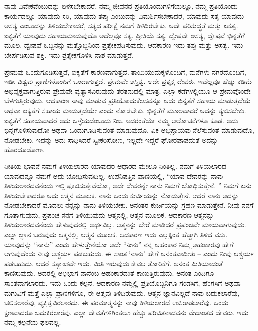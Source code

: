 ನಾವು ವಿವೇಕವೆಂಬುದನ್ನು ಬಳಸಬೇಕಾದರೆ, ನಮ್ಮ ಜೀವನದ ಪ್ರತಿಯೊಂದುಗಳಿಗೆ\break ಯಲ್ಲೂ, ನಮ್ಮ ಪ್ರತಿಯೊಂದು ಕಾರ್ಯದಲ್ಲೂ ಯಾವುದು ಸರಿ, ಯಾವುದು ತಪ್ಪು ಎಂಬುದನ್ನು ವಿಮರ್ಶಿಸಬೇಕಾದರೆ, ಯಾವುದು ಸತ್ಯ ಯಾವುದು ಅಸತ್ಯ ಎಂಬುದನ್ನು ತಿಳಿಯಬೇಕಾದರೆ, ಸತ್ಯದ ಪರೀಕ್ಷೆ ನಮಗೆ ತಿಳಿದಿರಬೇಕು. ಅದೇ ಪರಿಶುದ್ಧತೆ ಮತ್ತು ಏಕತ್ವ. ಐಕ್ಯತೆಗೆ ಯಾವುದು ಸಹಾಯಮಾಡುವುದೊ ಅದೆಲ್ಲವೂ ಸತ್ಯ. ಪ್ರೀತಿಯೆ ಸತ್ಯ. ದ್ವೇಷವೇ ಅಸತ್ಯ, ದ್ವೇಷವೆ ಭಿನ್ನತೆಗೆ ಮೂಲ. ದ್ವೇಷವೆ ಒಬ್ಬನನ್ನು ಮತ್ತೊಬ್ಬನಿಂದ ಪ್ರತ್ಯೇಕಪಡಿಸುವುದು. ಆದಕಾರಣ ಇದು ತಪ್ಪು ಮತ್ತು ಅಸತ್ಯ. ಇದು ಬೇರ್ಪಡಿಸುವ ಶಕ್ತಿ. ಇದು ಪ್ರತ್ಯೇಕಗೊಳಿಸಿ ನಾಶ ಮಾಡುತ್ತದೆ. 

ಪ್ರೇಮವು ಒಂದುಗೂಡಿಸುತ್ತದೆ, ಐಕ್ಯತೆಗೆ ಕಾರಣವಾಗುತ್ತದೆ. ತಾಯಿಯು\break ಮಕ್ಕಳೊಂದಿಗೆ, ಮನೆಗಳು ನಗರದೊಂದಿಗೆ, ಇಡೀ ವಿಶ್ವವು ಪ್ರಾಣಿಗಳೊಂದಿಗೆ ಒಂದಾಗುತ್ತದೆ. ಪ್ರೇಮವೇ ಅಸ್ತಿತ್ವ. ಅದೇ ಪ್ರತ್ಯಕ್ಷ ದೇವರು. ಇವೆಲ್ಲವೂ ಹೆಚ್ಚು ಕಡಿಮೆ ಅಭಿವ್ಯಕ್ತವಾಗುತ್ತಿರುವ ಪ್ರೇಮವೇ ವ್ಯತ್ಯಾಸವಿರುವುದು ತರತಮದಲ್ಲಿ ಮಾತ್ರ. ಎಲ್ಲಾ ಕಡೆಗಳಲ್ಲಿಯೂ ಆ ಪ್ರೇಮವೊಂದೇ ಬೆಳಗುತ್ತಿರುವುದು. ಆದಕಾರಣ ನಾವು ಮಾಡುವ ಪ್ರತಿಯೊಂದು\break ಕೆಲಸವನ್ನೂ ಅದು ಭಿನ್ನತೆಗೆ ಸಹಾಯ ಮಾಡುತ್ತದೆಯೆ ಅಥವಾ ಐಕ್ಯತೆಗೆ ಸಹಾಯ ಮಾಡುತ್ತದೆಯೇ ಎಂದು ನೋಡಬೇಕು. ಭಿನ್ನತೆಗೆ ಮೂಲವಾದರೆ ಅದನ್ನು ತ್ಯಜಿಸಬೇಕು. ಐಕ್ಯತೆಗೆ ಸಹಾಯವಾದರೆ ಅದು ಒಳ್ಳೆಯದೆಂಬುದು ನಿಜ. ಅದರಂತೆಯೇ ನಮ್ಮ ಆಲೋಚನೆಗಳೂ ಕೂಡ. ಅದು ಭಿನ್ನಗೊಳಿಸುವುದೋ ಅಥವಾ ಒಂದುಗೂಡಿಸುವಂತೆ ಮಾಡುವುದೊ, ಏಕ ಅಭಿಪ್ರಾಯವು ನೆಲೆಸುವಂತೆ ಮಾಡುವುದೊ, ನೋಡಬೇಕು. ಇದನ್ನು ಅದು ಸಾಧಿಸಿದರೆ ಸ್ವೀಕರಿಸೋಣ, ಇಲ್ಲದೇ ಇದ್ದರೆ ಘೋರಪಾಪದಂತೆ ಅದನ್ನು ಹೊರದೂಡೋಣ. 

ನೀತಿಯ ಭಾವನೆ ನಮಗೆ ತಿಳಿಯಲಾರದ ಯಾವುದರ ಆಧಾರದ ಮೇಲೂ ನಿಂತಿಲ್ಲ. ನಮಗೆ ತಿಳಿಯಲಾರದ ಯಾವುದನ್ನೂ ನಮಗೆ ಅದು ಬೋಧಿಸುವುದಿಲ್ಲ. ಉಪನಿಷತ್ತಿನ ವಾಣಿಯಲ್ಲಿ, “ಯಾವ ದೇವರನ್ನು ನಾವು ತಿಳಿಯಲಾರದವನೆಂದು ಇಲ್ಲಿ ಪೂಜಿಸುತ್ತೇ\break ವೆಯೋ, ಅದೇ ದೇವರನ್ನೇ ನಾನು ನಿಮಗೆ ಬೋಧಿಸುತ್ತೇನೆ. ” ನಿಮಗೆ ಏನು ತಿಳಿಯಬೇಕಾದರೂ ಅದು ಆತ್ಮನ ಮೂಲಕ. ನಾನು ಒಂದು ಕುರ್ಚಿಯನ್ನು ನೋಡುತ್ತೇನೆ. ಆದರೆ ನಾನು ಅದನ್ನು ನೋಡಬೇಕಾದರೆ ಮೊದಲು ನನ್ನನ್ನು ನಾನು ತಿಳಿಯಬೇಕು. ಅನಂತರ ಕುರ್ಚಿಯನ್ನು ಗ್ರಹಣ ಮಾಡುತ್ತೇನೆ. ನೀವು ನನಗೆ ಗೊತ್ತಾಗುವುದು, ಪ್ರಪಂಚ ನನಗೆ ತಿಳಿಯುವುದು ಆತ್ಮನಲ್ಲಿ, ಆತ್ಮನ ಮೂಲಕ. ಆದಕಾರಣ ಆತ್ಮನನ್ನು ತಿಳಿಯಲಾರದವನೆಂದು ಹೇಳುವುದರಲ್ಲಿ ಅರ್ಥವಿಲ್ಲ. ಆತ್ಮನನ್ನು ಬೇರೆ ಮಾಡಿದರೆ ಪ್ರಪಂಚವೇ ಮಾಯವಾಗುವುದು. ಎಲ್ಲಾ ಜ್ಞಾನ ಬರುವುದು ಆತ್ಮನಲ್ಲಿ, ಆತ್ಮನ ಮೂಲಕ. ಆದಕಾರಣ ಇದು ಎಲ್ಲಕ್ಕಿಂತ ಹೆಚ್ಚಾಗಿ ತಿಳಿದ ವಸ್ತು. ಯಾವುದನ್ನು “ನಾನು” ಎಂದು ಹೇಳುತ್ತೇನೆಯೋ ಅದೇ “ನೀನು” ನನ್ನ ಅಹಂಕಾರ ನಿಮ್ಮ ಅಹಂಕಾರವು ಹೇಗೆ ಆಗುವುದೆಂದು ನೀವು ಆಶ್ಚರ್ಯ ಪಡಬಹುದು. ಈ ಸಾಂತ ‘ನಾನು’ ಹೇಗೆ ಅನಂತವಾದೀತು – ಎಂದು ನೀವು ಆಶ್ಚರ್ಯ ಪಡಬಹುದು. ಆದರೆ ಸತ್ಯಾಂಶವೇ ಇದು. ಮಿತಿ ಇರುವುದು ಕೇವಲ ತೋರಿಕೆಗೆ. ಅನಂತ ಮಿತಿಯಾದಂತೆ ಕಾಣಿಸುವುದು. ಅದರಲ್ಲಿ ಅಲ್ಪಭಾಗ ನಾನೆಂಬ ಅಹಂಕಾರದಂತೆ ಕಾಣುತ್ತಿರುವುದು. ಅನಂತ ಎಂದಿಗೂ ಸಾಂತವಾಗಲಾರದು. ಇದು ಒಂದು ಕಲ್ಪನೆ. ಆದಕಾರಣ ನಮ್ಮಲ್ಲಿ ಪ್ರತಿಯೊಬ್ಬನಿಗೂ ಗಂಡಸಿಗೆ, ಹೆಂಗಸಿಗೆ ಅಥವಾ ಮಗುವಿಗೆ ಮತ್ತೆ ಎಲ್ಲಾ ಪ್ರಾಣಿಗಳಿಗೂ, ಈ ಆತ್ಮವು ತಿಳಿದಿರುವುದು. ಆತ್ಮನ ಜ್ಞಾನವಿಲ್ಲದೆ ನಾವು ಬದುಕಲಾರೆವು, ಚಲಿಸಲಾರೆವು, ವ್ಯಕ್ತಿತ್ವವಿರಲಾರದು. ಈ ಪರಮಾತ್ಮನನ್ನು ನಾವು ತಿಳಿಯಲಾರದೆ ಉಸಿರಾಡಲಾರೆವು. ಒಂದು ಕ್ಷಣವಾದರೂ ಬದುಕಿರಲಾರೆವು. ಎಲ್ಲಾ ದೇವತೆಗಳಿಗಿಂತಲೂ ಹೆಚ್ಚು ಪರಿಚಿತನಾದವನು ವೇದಾಂತದ ದೇವರು. ಇದು ನಮ್ಮ ಕಲ್ಪನೆಯ ಫಲವಲ್ಲ. 

